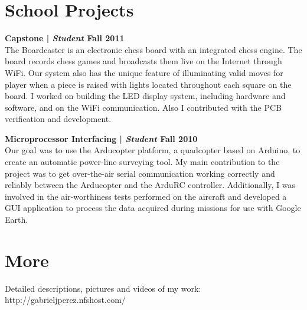 \documentclass[margin,line]{res}
\begin{document}
\begin{resume}
\section{\sc School Projects}

{\bf Capstone | {\em Student} \hfill {\bf Fall 2011 \\} }
\vspace{-.01cm}
The Boardcaster is an electronic chess board with an integrated chess engine. The board records chess games and broadcasts them live on the Internet through WiFi. Our system also has the unique feature of illuminating valid moves for player when a piece is raised with lights located throughout each square on the board. I worked on building the LED display system, including hardware and software, and on the WiFi communication. Also I contributed with the PCB verification and development.

{\bf Microprocessor Interfacing | {\em Student} \hfill {\bf Fall 2010 \\} }
\vspace{-.01cm}
Our goal was to use the Arducopter platform, a quadcopter based on Arduino, to create an automatic power-line surveying tool. My main contribution to the project was to get over-the-air serial communication working correctly and reliably between the Arducopter and the ArduRC controller. Additionally, I was involved in the air-worthiness tests performed on the aircraft and developed a GUI application to process the data acquired during missions for use with Google Earth.

\section{\sc More}
Detailed  descriptions, pictures and videos of my work: http://gabrieljperez.nfshost.com/    \\

\end{resume}
\end{document}
